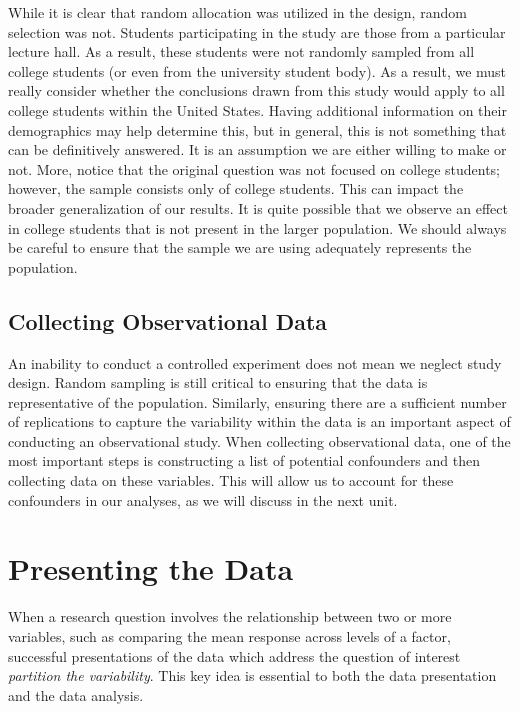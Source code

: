\documentclass[]{book}
\theoremstyle{definition}
\theoremstyle{definition}
\theoremstyle{remark}
\begin{document}
While it is clear that random allocation was utilized in the design,
random selection was not. Students participating in the study are those
from a particular lecture hall. As a result, these students were not
randomly sampled from all college students (or even from the university
student body). As a result, we must really consider whether the
conclusions drawn from this study would apply to all college students
within the United States. Having additional information on their
demographics may help determine this, but in general, this is not
something that can be definitively answered. It is an assumption we are
either willing to make or not. More, notice that the original question
was not focused on college students; however, the sample consists only
of college students. This can impact the broader generalization of our
results. It is quite possible that we observe an effect in college
students that is not present in the larger population. We should always
be careful to ensure that the sample we are using adequately represents
the population.

\section{Collecting Observational
Data}\label{collecting-observational-data}

An inability to conduct a controlled experiment does not mean we neglect
study design. Random sampling is still critical to ensuring that the
data is representative of the population. Similarly, ensuring there are
a sufficient number of replications to capture the variability within
the data is an important aspect of conducting an observational study.
When collecting observational data, one of the most important steps is
constructing a list of potential confounders and then collecting data on
these variables. This will allow us to account for these confounders in
our analyses, as we will discuss in the next unit.

\chapter{Presenting the Data}\label{ANOVAsummaries}

When a research question involves the relationship between two or more
variables, such as comparing the mean response across levels of a
factor, successful presentations of the data which address the question
of interest \emph{partition the variability}. This key idea is essential
to both the data presentation and the data analysis.
\end{document}
